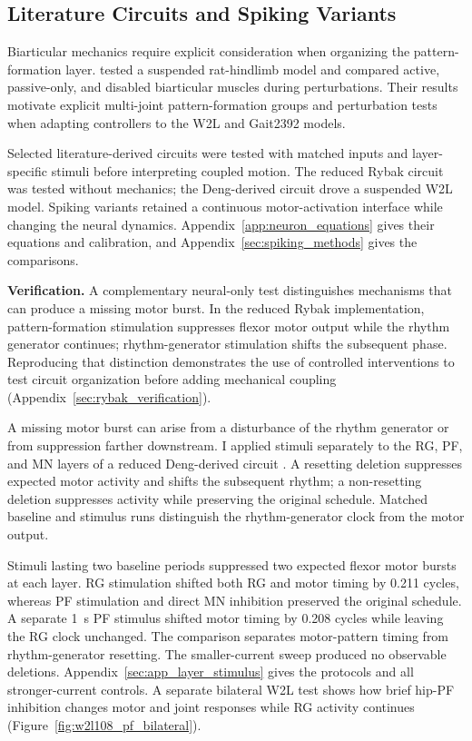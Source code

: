 \FloatBarrier

\subsection{Literature Circuits and Spiking Variants}\label{sec:sns_literature_methods}\label{sec:sns_literature_results}\label{sec:layer_stimulus_main}

Biarticular mechanics require explicit consideration when organizing the pattern-formation layer. \citet{deng_biarticular_2023} tested a suspended rat-hindlimb model and compared active, passive-only, and disabled biarticular muscles during perturbations. Their results motivate explicit multi-joint pattern-formation groups and perturbation tests when adapting controllers to the W2L and Gait2392 models.

Selected literature-derived circuits were tested with matched inputs and layer-specific stimuli before interpreting coupled motion. The reduced Rybak circuit was tested without mechanics; the Deng-derived circuit drove a suspended W2L model. Spiking variants retained a continuous motor-activation interface while changing the neural dynamics. Appendix~\ref{app:neuron_equations} gives their equations and calibration, and Appendix~\ref{sec:spiking_methods} gives the comparisons.

\noindent\textbf{Verification.} A complementary neural-only test distinguishes mechanisms that can produce a missing motor burst. In the reduced Rybak implementation, pattern-formation stimulation suppresses flexor motor output while the rhythm generator continues; rhythm-generator stimulation shifts the subsequent phase. Reproducing that distinction demonstrates the use of controlled interventions to test circuit organization before adding mechanical coupling (Appendix~\ref{sec:rybak_verification}).

A missing motor burst can arise from a disturbance of the rhythm generator or from suppression farther downstream. I applied stimuli separately to the RG, PF, and MN layers of a reduced Deng-derived circuit \citep{deng_neuromechanical_2019,nourse_sns_2023}. A resetting deletion suppresses expected motor activity and shifts the subsequent rhythm; a non-resetting deletion suppresses activity while preserving the original schedule. Matched baseline and stimulus runs distinguish the rhythm-generator clock from the motor output.

Stimuli lasting two baseline periods suppressed two expected flexor motor bursts at each layer. RG stimulation shifted both RG and motor timing by 0.211 cycles, whereas PF stimulation and direct MN inhibition preserved the original schedule. A separate \qty{1}{\second} PF stimulus shifted motor timing by 0.208 cycles while leaving the RG clock unchanged. The comparison separates motor-pattern timing from rhythm-generator resetting. The smaller-current sweep produced no observable deletions. Appendix~\ref{sec:app_layer_stimulus} gives the protocols and all stronger-current controls. A separate bilateral W2L test shows how brief hip-PF inhibition changes motor and joint responses while RG activity continues (Figure~\ref{fig:w2l108_pf_bilateral}).


